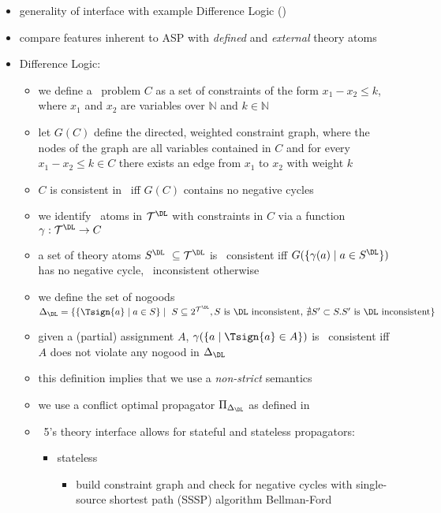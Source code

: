 \begin{itemize}
 \item generality of interface with example Difference Logic (\DL)
 \item compare features inherent to ASP with \emph{defined} and \emph{external} theory atoms
 \item Difference Logic:
    \begin{itemize}
     \item we define a \DL\ problem $C$ as a set of constraints of the form $x_1 - x_2 \leq k$,
           where $x_1$ and $x_2$ are variables over $\mathbb{N}$ and $k\in \mathbb{N}$
     \item let $G(C)$ define the directed, weighted constraint graph, 
           where the nodes of the graph are all variables contained in $C$
           and for every $x_1 - x_2\leq k \in C$ there exists an edge from $x_1$ to $x_2$ with weight $k$ 
     \item $C$ is consistent in \DL\ iff $G(C)$ contains no negative cycles
     \item we identify \DL\ atoms in $\mathcal{T}^{\DL}$ with constraints in $C$ via a function $\gamma:\mathcal{T}^{\DL}\rightarrow C$ 
     \item a set of theory atoms $S^\DL\ \subseteq \mathcal{T}^{\DL}$ is \DL\ consistent 
           iff $G(\{\gamma(a) \mid a \in S^\DL\})$ has no negative cycle, \DL\ inconsistent otherwise
     \item we define the set of nogoods $\Delta_\DL=\{\{\Tsign{a}\mid a\in S\}\mid\ S \subseteq 2^{\mathcal{T}^{\DL}}, 
                S\text{ is \DL\ inconsistent, }\nexists S'\subset S.S'\text{ is \DL\ inconsistent} \}$
     \item given a (partial) assignment $A$, $\gamma(\{a \mid \Tsign{a} \in A\})$ is \DL\ consistent iff $A$ does not violate any nogood in $\Delta_\DL$
     \item this definition implies that we use a \emph{non-strict} semantics
     \item we use a conflict optimal propagator $\Pi_{\Delta_\DL}$ as defined in~\cite{drewal12a}
     \item \clingo~5's theory interface allows for stateful and stateless propagators:
     \begin{itemize}
	\item stateless
	\begin{itemize}
	 \item build constraint graph and check for negative cycles with single-source shortest path (SSSP) algorithm Bellman-Ford \cite{be58a,fofu62a}

\end{itemize}
\end{itemize}
\end{itemize}
\end{itemize}
